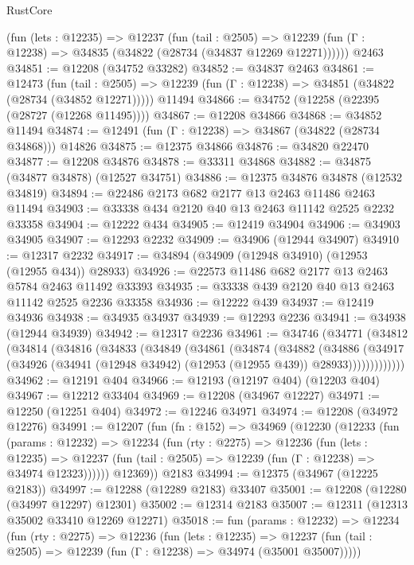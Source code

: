 \begin{lexlean}{RustCore}
\begin{coremodule}
    (fun (lets : @12235) =>
    @12237
      (fun (tail : @2505) =>
      @12239 (fun (Γ : @12238) => @34835 (@34822 (@28734 (@34837 @12269 @12271))))))
    @2463
@34851 := @12208 (@34752 @33282)
@34852 := @34837 @2463
@34861 := @12473
    (fun (tail : @2505) => @12239 (fun (Γ : @12238) => @34851 (@34822 (@28734 (@34852 @12271)))))
    @11494
@34866 := @34752 (@12258 (@22395 (@28727 (@12268 @11495))))
@34867 := @12208 @34866
@34868 := @34852 @11494
@34874 := @12491 (fun (Γ : @12238) => @34867 (@34822 (@28734 @34868))) @14826
@34875 := @12375 @34866
@34876 := @34820 @22470
@34877 := @12208 @34876
@34878 := @33311 @34868
@34882 := @34875 (@34877 @34878) (@12527 @34751)
@34886 := @12375 @34876 @34878 (@12532 @34819)
@34894 := @22486 @2173 @682 @2177 @13 @2463 @11486 @2463 @11494
@34903 := @33338 @434 @2120 @40 @13 @2463 @11142 @2525 @2232 @33358
@34904 := @12222 @434
@34905 := @12419 @34904
@34906 := @34903 @34905
@34907 := @12293 @2232
@34909 := @34906 (@12944 @34907)
@34910 := @12317 @2232
@34917 := @34894 (@34909 (@12948 @34910) (@12953 (@12955 @434)) @28933)
@34926 := @22573 @11486 @682 @2177 @13 @2463 @5784 @2463 @11492 @33393
@34935 := @33338 @439 @2120 @40 @13 @2463 @11142 @2525 @2236 @33358
@34936 := @12222 @439
@34937 := @12419 @34936
@34938 := @34935 @34937
@34939 := @12293 @2236
@34941 := @34938 (@12944 @34939)
@34942 := @12317 @2236
@34961 := @34746
    (@34771
      (@34812
        (@34814
          (@34816
            (@34833
              (@34849
                (@34861
                  (@34874
                    (@34882
                      (@34886
                        (@34917
                          (@34926 (@34941 (@12948 @34942) (@12953 (@12955 @439)) @28933)))))))))))))
@34962 := @12191 @404
@34966 := @12193 (@12197 @404) (@12203 @404)
@34967 := @12212 @33404
@34969 := @12208 (@34967 @12227)
@34971 := @12250 (@12251 @404)
@34972 := @12246 @34971
@34974 := @12208 (@34972 @12276)
@34991 := @12207
    (fun (fn : @152) =>
    @34969
      (@12230
        (@12233
          (fun (params : @12232) =>
          @12234
            (fun (rty : @2275) =>
            @12236
              (fun (lets : @12235) =>
              @12237 (fun (tail : @2505) => @12239 (fun (Γ : @12238) => @34974 @12323))))))
        @12369))
    @2183
@34994 := @12375 (@34967 (@12225 @2183))
@34997 := @12288 (@12289 @2183) @33407
@35001 := @12208 (@12280 (@34997 @12297) @12301)
@35002 := @12314 @2183
@35007 := @12311 (@12313 @35002 @33410 @12269 @12271)
@35018 := fun (params : @12232) =>
  @12234
    (fun (rty : @2275) =>
    @12236
      (fun (lets : @12235) =>
      @12237 (fun (tail : @2505) => @12239 (fun (Γ : @12238) => @34974 (@35001 @35007)))))

\end{coremodule}
\end{lexlean}
